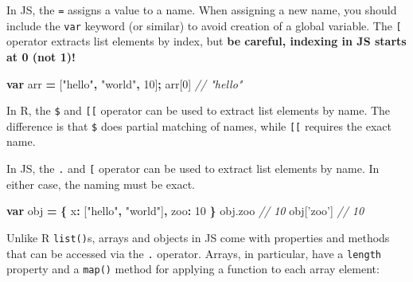 \documentclass[
  12pt,
]{krantz}
\newenvironment{Shaded}{\begin{snugshade}}{\end{snugshade}}
\newcommand{\AttributeTok}[1]{\textcolor[rgb]{0.77,0.63,0.00}{#1}}
\newcommand{\CommentTok}[1]{\textcolor[rgb]{0.56,0.35,0.01}{\textit{#1}}}
\newcommand{\DataTypeTok}[1]{\textcolor[rgb]{0.13,0.29,0.53}{#1}}
\newcommand{\DecValTok}[1]{\textcolor[rgb]{0.00,0.00,0.81}{#1}}
\newcommand{\KeywordTok}[1]{\textcolor[rgb]{0.13,0.29,0.53}{\textbf{#1}}}
\newcommand{\NormalTok}[1]{#1}
\newcommand{\OperatorTok}[1]{\textcolor[rgb]{0.81,0.36,0.00}{\textbf{#1}}}
\newcommand{\StringTok}[1]{\textcolor[rgb]{0.31,0.60,0.02}{#1}}
\newcommand{\VariableTok}[1]{\textcolor[rgb]{0.00,0.00,0.00}{#1}}
\begin{document}
In JS, the \texttt{=} assigns a value to a name. When assigning a new name, you should include the \texttt{var} keyword (or similar) to avoid creation of a global variable. The \texttt{{[}} operator extracts list elements by index, but \textbf{be careful, indexing in JS starts at 0 (not 1)!}

\begin{Shaded}
\begin{Highlighting}[]
\KeywordTok{var}\NormalTok{ arr }\OperatorTok{=}\NormalTok{ [}\StringTok{"hello"}\OperatorTok{,} \StringTok{"world"}\OperatorTok{,} \DecValTok{10}\NormalTok{]}\OperatorTok{;}
\NormalTok{arr[}\DecValTok{0}\NormalTok{]}
\CommentTok{// "hello"}
\end{Highlighting}
\end{Shaded}

In R, the \texttt{\$} and \texttt{{[}{[}} operator can be used to extract list elements by name. The difference is that \texttt{\$} does partial matching of names, while \texttt{{[}{[}} requires the exact name.

\begin{Shaded}
\end{Shaded}

In JS, the \texttt{.} and \texttt{{[}} operator can be used to extract list elements by name. In either case, the naming must be exact.

\begin{Shaded}
\begin{Highlighting}[]
\KeywordTok{var}\NormalTok{ obj }\OperatorTok{=} \OperatorTok{\{}
  \DataTypeTok{x}\OperatorTok{:}\NormalTok{ [}\StringTok{"hello"}\OperatorTok{,} \StringTok{"world"}\NormalTok{]}\OperatorTok{,}
  \DataTypeTok{zoo}\OperatorTok{:} \DecValTok{10}
\OperatorTok{\}}
\VariableTok{obj}\NormalTok{.}\AttributeTok{zoo}
\CommentTok{// 10}
\NormalTok{obj[}\StringTok{'zoo'}\NormalTok{]}
\CommentTok{// 10}
\end{Highlighting}
\end{Shaded}

Unlike R \texttt{list()}s, arrays and objects in JS come with properties and methods that can be accessed via the \texttt{.} operator. Arrays, in particular, have a \texttt{length} property and a \texttt{map()} method for applying a function to each array element:
\end{document}
